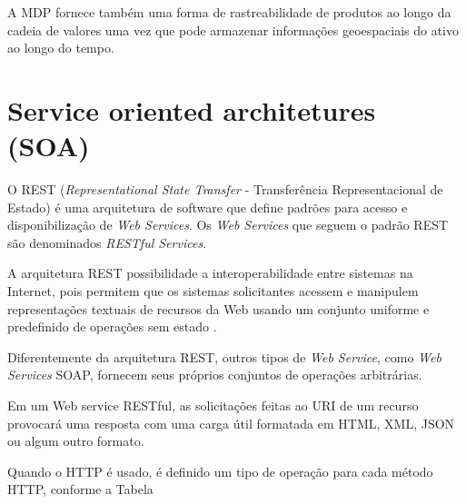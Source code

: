 	A MDP fornece também uma forma de rastreabilidade de produtos ao longo da cadeia de valores uma vez que pode armazenar informações geoespaciais do ativo ao longo do tempo.


\section{Service oriented architetures (SOA)}
	
	\cite{souit2013soa}
	
	O REST (\textit{Representational State Transfer} - Transferência Representacional de Estado) é uma arquitetura de software que define padrões para acesso e disponibilização de \textit{Web Services}. Os \textit{Web Services} que seguem o padrão REST são denominados \textit{RESTful Services}.
	
	A arquitetura REST possibilidade a interoperabilidade entre sistemas na Internet, pois permitem que os sistemas solicitantes acessem e manipulem representações textuais de recursos da Web usando um conjunto uniforme e predefinido de operações sem estado \cite{ferris2004webservices}.
	
	Diferentemente da arquitetura REST, outros tipos de \textit{Web Service}, como \textit{Web Services} SOAP, fornecem seus próprios conjuntos de operações arbitrárias.
	
	Em um Web service RESTful, as solicitações feitas ao URI de um recurso provocará uma resposta com uma carga útil formatada em HTML, XML, JSON ou algum outro formato.
	
	Quando o HTTP é usado, é definido um tipo de operação para cada método HTTP, conforme a Tabela
	

